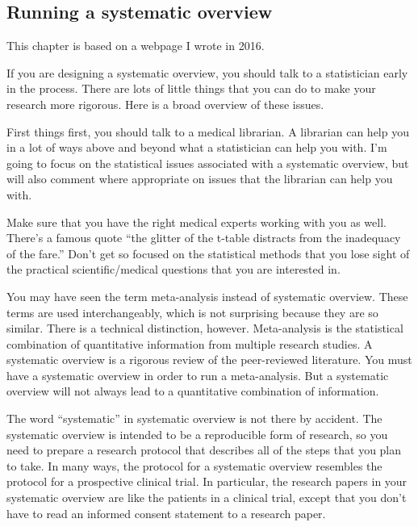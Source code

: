 \documentclass[
  letterpaper,
  DIV=11,
  numbers=noendperiod]{scrreprt}
\begin{document}
\begin{tcolorbox}

\chapter{Running a systematic
overview}\label{running-a-systematic-overview}

This chapter is based on a webpage I wrote in 2016.

If you are designing a systematic overview, you should talk to a
statistician early in the process. There are lots of little things that
you can do to make your research more rigorous. Here is a broad overview
of these issues.

First things first, you should talk to a medical librarian. A librarian
can help you in a lot of ways above and beyond what a statistician can
help you with. I'm going to focus on the statistical issues associated
with a systematic overview, but will also comment where appropriate on
issues that the librarian can help you with.

Make sure that you have the right medical experts working with you as
well. There's a famous quote ``the glitter of the t-table distracts from
the inadequacy of the fare.'' Don't get so focused on the statistical
methods that you lose sight of the practical scientific/medical
questions that you are interested in.

You may have seen the term meta-analysis instead of systematic overview.
These terms are used interchangeably, which is not surprising because
they are so similar. There is a technical distinction, however.
Meta-analysis is the statistical combination of quantitative information
from multiple research studies. A systematic overview is a rigorous
review of the peer-reviewed literature. You must have a systematic
overview in order to run a meta-analysis. But a systematic overview will
not always lead to a quantitative combination of information.

The word ``systematic'' in systematic overview is not there by accident.
The systematic overview is intended to be a reproducible form of
research, so you need to prepare a research protocol that describes all
of the steps that you plan to take. In many ways, the protocol for a
systematic overview resembles the protocol for a prospective clinical
trial. In particular, the research papers in your systematic overview
are like the patients in a clinical trial, except that you don't have to
read an informed consent statement to a research paper.


\end{tcolorbox}
\end{document}
